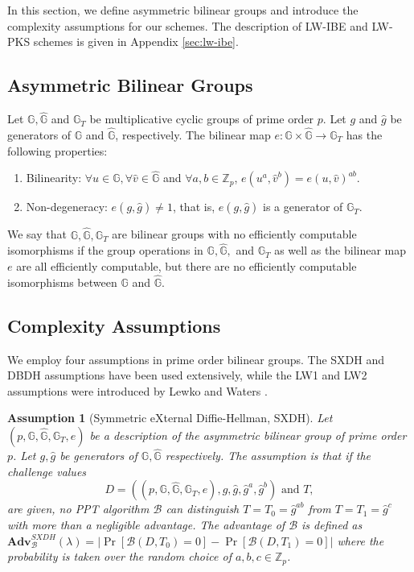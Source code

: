 \documentclass[11pt,letterpaper]{article}
\newtheorem{assumption}[theorem]{Assumption}
\newcommand{\G}{\mathbb{G}}
\newcommand{\Z}{\mathbb{Z}}
\newcommand{\Adv}{\textbf{Adv}}
\newcommand{\mc}[1]{\mathcal{#1}}
\begin{document}
In this section, we define asymmetric bilinear groups and introduce the
complexity assumptions for our schemes. The description of LW-IBE and LW-PKS
schemes is given in Appendix \ref{sec:lw-ibe}.

\subsection{Asymmetric Bilinear Groups}

Let $\G, \hat{\G}$ and $\G_{T}$ be multiplicative cyclic groups of prime
order $p$. Let $g$ and $\hat{g}$ be generators of $\G$ and $\hat{\G}$,
respectively. The bilinear map $e : \G \times \hat{\G} \rightarrow \G_{T}$
has the following properties:
\begin{enumerate}
\item Bilinearity: $\forall u \in \G, \forall \hat{v} \in \hat{\G}$ and
    $\forall a,b \in \Z_p$, $e(u^a,\hat{v}^b) = e(u,\hat{v})^{ab}$.
\item Non-degeneracy: $e(g,\hat{g}) \neq 1$, that is, $e(g,\hat{g})$ is a
    generator of $\G_T$.
\end{enumerate}
We say that $\G, \hat{\G}, \G_T$ are bilinear groups with no efficiently
computable isomorphisms if the group operations in $\G, \hat{\G},$ and $\G_T$
as well as the bilinear map $e$ are all efficiently computable, but there are
no efficiently computable isomorphisms between $\G$ and $\hat{\G}$.

\subsection{Complexity Assumptions}

We employ four assumptions in prime order bilinear groups. The SXDH and DBDH
assumptions have been used extensively, while the LW1 and LW2 assumptions
were introduced by Lewko and Waters \cite{LewkoW10}.

\begin{assumption}[Symmetric eXternal Diffie-Hellman, SXDH]
Let $(p, \G, \hat{\G}, \G_T, e)$ be a description of the asymmetric bilinear
group of prime order $p$. Let $g, \hat{g}$ be generators of $\G, \hat{\G}$
respectively. The assumption is that if the challenge values
    $$D = ((p, \G, \hat{\G}, \G_T, e),
    g, \hat{g}, \hat{g}^a, \hat{g}^b) \mbox{ and } T,$$
are given, no PPT algorithm $\mc{B}$ can distinguish $T = T_0 = \hat{g}^{ab}$
from $T = T_1 = \hat{g}^c$ with more than a negligible advantage. The
advantage of $\mc{B}$ is defined as $\Adv_{\mc{B}}^{SXDH}(\lambda) = \big|
\Pr[\mc{B}(D, T_0)=0] - \Pr[\mc{B}(D, T_1)=0] \big|$ where the probability is
taken over the random choice of $a, b, c \in \Z_p$.
\end{assumption}
\end{document}
